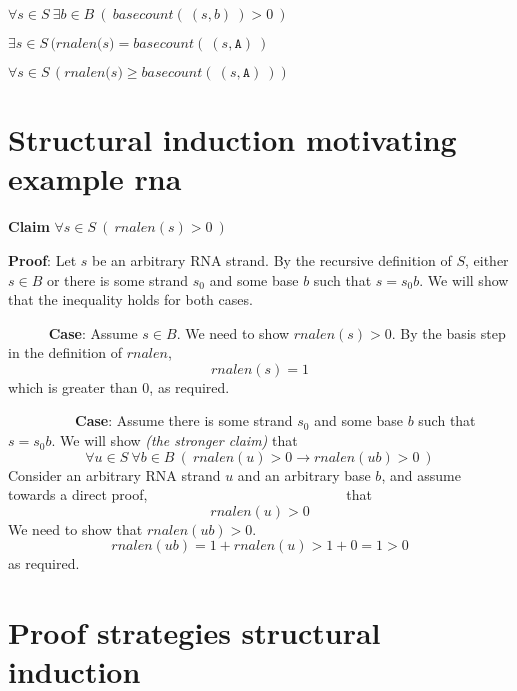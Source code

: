 \documentclass[12pt, oneside]{article}
\newcommand{\A}[0]{\texttt{A}}
\begin{document}
\vspace{100pt}

$\forall s \in S ~\exists b\in B ~(~basecount(~(s,b)~) > 0~)$

\vspace{100pt}

$\exists s \in S \, (\textit{rnalen(s)} = \textit{basecount}(~(s, \A)~)$

\vspace{100pt}

$\forall s \in S \, (\textit{rnalen(s)} \geq \textit{basecount}(~(s, \A)~))$

\vspace{100pt}

 \vfill
\section*{Structural induction motivating example rna}


{\bf Claim} $\forall s \in S ~(~rnalen(s) > 0~)$

{\bf Proof}: Let $s$ be an arbitrary RNA strand. By the recursive definition of $S$,
either $s \in B$ or there is some strand $s_0$ and some base $b$ such that $s = s_0 b$.
We will show that the inequality holds for both cases.

{$\phantom{Basis}$} {\bf Case}: Assume $s \in B$. We need to show $rnalen(s) > 0$. 
By the basis step in the definition of $rnalen$,
$$rnalen(s) = 1$$
which is greater than $0$, as required.

{$\phantom{Recursive}$} {\bf Case}: Assume there is some strand $s_0$ and some base $b$ 
such that $s = s_0 b$. We will show {\it (the stronger claim)} that 
\[
    \forall u \in S ~\forall b \in B ~( ~\textit{rnalen}(u) >0  \to 
    \textit{rnalen}(ub) >0 ~)
\]
Consider an arbitrary RNA strand $u$ and an arbitrary base $b$, and assume towards a
direct proof,$~~{\phantom{ this is the induction hypothesis}}~~$ that
\[
    rnalen(u) > 0
\]
We need to show that $rnalen(ub) > 0$.
\[
    rnalen(ub) = 1 + rnalen (u) > 1 + 0 = 1 > 0
\]
as required. \vfill
\section*{Proof strategies structural induction}


     \vfill
\end{document}
